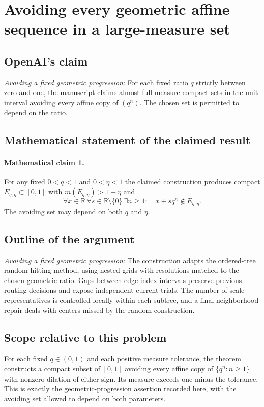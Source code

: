 \documentclass[11pt]{article}
\begin{document}
\section*{Avoiding every geometric affine sequence in a large-measure set}

\subsection{OpenAI's claim}
\textit{Avoiding a fixed geometric progression}: For each fixed ratio $q$ strictly between zero and one, the manuscript claims almost-full-measure compact sets in the unit interval avoiding every affine copy of $(q^n)$. The chosen set is permitted to depend on the ratio.

\subsection{Mathematical statement of the claimed result}
\paragraph{Mathematical claim 1.} For any fixed $0<q<1$ and $0<\eta<1$ the claimed construction produces compact $E_{q,\eta}\subset[0,1]$ with $m(E_{q,\eta})>1-\eta$ and \[\forall x\in\mathbb R\ \forall s\in\mathbb R\setminus\{0\}\ \exists n\ge1:\quad x+sq^n\notin E_{q,\eta}.\] The avoiding set may depend on both $q$ and $\eta$.

\subsection{Outline of the argument}
\textit{Avoiding a fixed geometric progression}: The construction adapts the ordered-tree random hitting method, using nested grids with resolutions matched to the chosen geometric ratio. Gaps between edge index intervals preserve previous routing decisions and expose independent current trials. The number of scale representatives is controlled locally within each subtree, and a final neighborhood repair deals with centers missed by the random construction.

\subsection{Scope relative to this problem}
For each fixed $q\in(0,1)$ and each positive measure tolerance, the theorem constructs a compact subset of $[0,1]$ avoiding every affine copy of $\{q^n:n\ge1\}$ with nonzero dilation of either sign. Its measure exceeds one minus the tolerance. This is exactly the geometric-progression assertion recorded here, with the avoiding set allowed to depend on both parameters.
\end{document}
